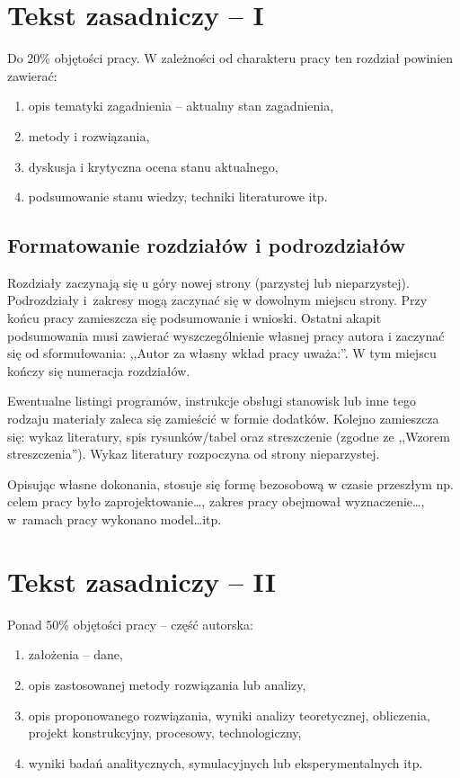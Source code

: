 \documentclass[12pt,twoside,openright]{article}
\begin{document}
\section{Tekst zasadniczy -- I}

Do 20\% objętości pracy. W zależności od charakteru pracy ten rozdział powinien zawierać:
\begin{enumerate}[label=\alph*), leftmargin=1.25cm]
	\item opis tematyki zagadnienia -- aktualny stan zagadnienia,
	\item metody i rozwiązania,
	\item dyskusja i krytyczna ocena stanu aktualnego,
	\item podsumowanie stanu wiedzy, techniki literaturowe itp.
\end{enumerate}

\subsection{Formatowanie rozdziałów i podrozdziałów}
Rozdziały zaczynają się u góry nowej strony (parzystej lub nieparzystej).
Podrozdziały i~zakresy mogą zaczynać się w dowolnym miejscu strony.
Przy końcu pracy zamieszcza się podsumowanie i wnioski. Ostatni akapit podsumowania musi zawierać wyszczególnienie własnej pracy autora i zaczynać się od sformułowania: ,,Autor za własny wkład pracy uważa:''.
W tym miejscu kończy się numeracja rozdziałów.

Ewentualne listingi programów, instrukcje obsługi stanowisk lub inne tego rodzaju materiały zaleca się zamieścić w formie dodatków.
Kolejno zamieszcza się: wykaz literatury, spis rysunków/tabel oraz streszczenie (zgodne ze ,,Wzorem streszczenia'').
Wykaz literatury rozpoczyna od strony nieparzystej.

Opisując własne dokonania, stosuje się formę bezosobową w czasie przeszłym np. celem pracy było zaprojektowanie\ldots, zakres pracy obejmował wyznaczenie\ldots, w~ramach pracy wykonano model\ldots itp.

\section{Tekst zasadniczy -- II}

Ponad 50\% objętości pracy -- część autorska:
\begin{enumerate}[label=\alph*), leftmargin=1.25cm] 
	\item założenia -- dane,
	\item opis zastosowanej metody rozwiązania lub analizy,
	\item opis proponowanego rozwiązania, wyniki analizy teoretycznej, obliczenia, projekt konstrukcyjny, procesowy, technologiczny,
	\item wyniki badań analitycznych, symulacyjnych lub eksperymentalnych itp.
\end{enumerate}
\end{document}
